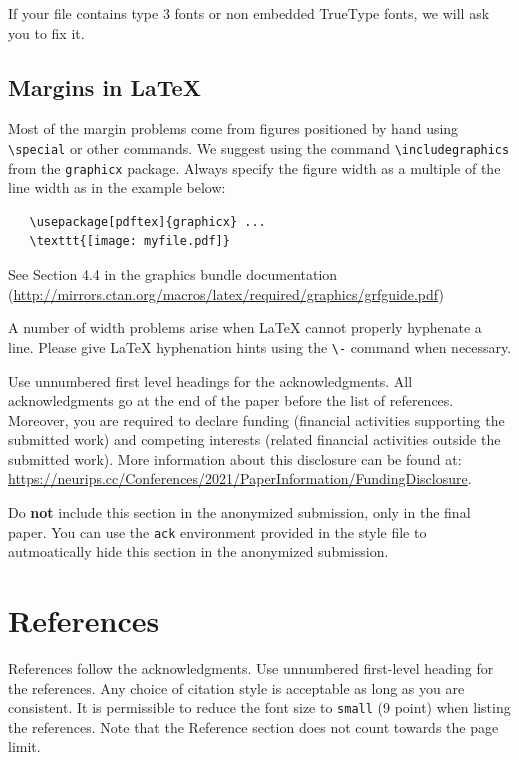 \documentclass{article}
\begin{document}
If your file contains type 3 fonts or non embedded TrueType fonts, we will ask
you to fix it.

\subsection{Margins in \LaTeX{}}

Most of the margin problems come from figures positioned by hand using
\verb+\special+ or other commands. We suggest using the command
\verb+\includegraphics+ from the \verb+graphicx+ package. Always specify the
figure width as a multiple of the line width as in the example below:
\begin{verbatim}
   \usepackage[pdftex]{graphicx} ...
   \texttt{[image: myfile.pdf]}
\end{verbatim}
See Section 4.4 in the graphics bundle documentation
(\url{http://mirrors.ctan.org/macros/latex/required/graphics/grfguide.pdf})

A number of width problems arise when \LaTeX{} cannot properly hyphenate a
line. Please give LaTeX hyphenation hints using the \verb+\-+ command when
necessary.

\begin{ack}
Use unnumbered first level headings for the acknowledgments. All acknowledgments
go at the end of the paper before the list of references. Moreover, you are required to declare
funding (financial activities supporting the submitted work) and competing interests (related financial activities outside the submitted work).
More information about this disclosure can be found at: \url{https://neurips.cc/Conferences/2021/PaperInformation/FundingDisclosure}.

Do {\bf not} include this section in the anonymized submission, only in the final paper. You can use the \texttt{ack} environment provided in the style file to autmoatically hide this section in the anonymized submission.
\end{ack}

\section*{References}

References follow the acknowledgments. Use unnumbered first-level heading for
the references. Any choice of citation style is acceptable as long as you are
consistent. It is permissible to reduce the font size to \verb+small+ (9 point)
when listing the references.
Note that the Reference section does not count towards the page limit.
\medskip
\end{document}
